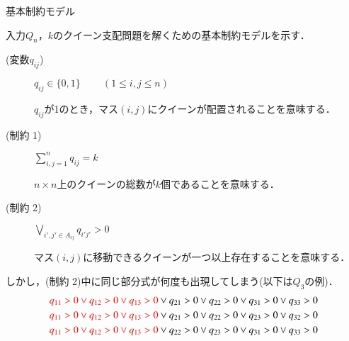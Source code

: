 \appendix
\backupbegin

%
%

\begin{frame}{基本制約モデル}
 \begin{block}{}
  入力$Q_n$，$k$のクイーン支配問題を解くための基本制約モデルを示す．
  \begin{description}
   \item[{\color{black} (変数$q_{ij}$})] $q_{ij} \in \{0,1\}\;\;\;\;\;\;\;\;(1 \leq i,j \leq n)$ \par
	      $q_{ij}$が1のとき，マス$(i,j)$にクイーンが配置されることを意味する．
   \item[{\color{black}(制約 1)}] $\sum\limits_{i,j=1}^{n} q_{ij} = k$ \par
	      $n \times n$上のクイーンの総数が$k$個であることを意味する．
   \item[{\color{black}(制約 2)}] $\bigvee\limits_{i',j' \in A_{ij}}q_{i'j'} > 0$ \par
	      マス$(i,j)$に移動できるクイーンが一つ以上存在することを意味する．
  \end{description}
 \end{block}
 \begin{alertblock}{}
  しかし，(制約 2)中に同じ部分式が何度も出現してしまう(以下は$Q_3$の例)．
  \begin{align*}
   {\color{red} q_{11}>0 \vee q_{12}>0 \vee q_{13}>0} \vee q_{21}>0 \vee q_{22}>0 \vee q_{31}>0 \vee q_{33}>0 \\
   {\color{red} q_{11}>0 \vee q_{12}>0 \vee q_{13}>0} \vee q_{21}>0 \vee q_{22}>0 \vee q_{23}>0 \vee q_{32}>0 \\
   {\color{red} q_{11}>0 \vee q_{12}>0 \vee q_{13}>0} \vee q_{22}>0 \vee q_{23}>0 \vee q_{31}>0 \vee q_{33}>0 
  \end{align*}
 \end{alertblock}
\end{frame}

%
%

